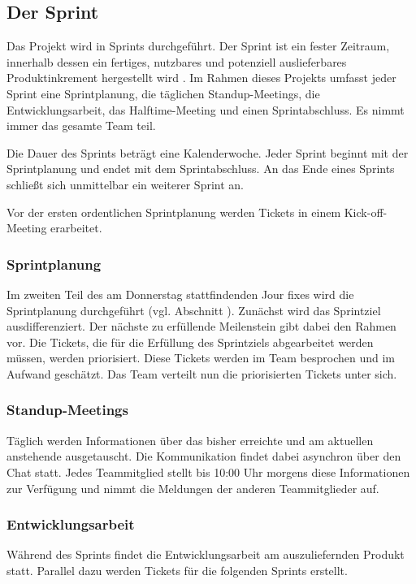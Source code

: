 \documentclass[a4paper,11pt,listof=numbered,glossary=totoc,parskip=half,toc=bib]{scrreprt}
\begin{document}
\subsection{Der Sprint}
Das Projekt wird in Sprints durchgeführt. Der Sprint ist ein fester Zeitraum, innerhalb dessen ein fertiges, nutzbares und potenziell auslieferbares Produktinkrement hergestellt wird \autocite[S.9]{Scrum}. Im Rahmen dieses Projekts umfasst jeder Sprint eine Sprintplanung, die täglichen Standup-Meetings, die Entwicklungsarbeit, das Halftime-Meeting und einen Sprintabschluss. Es nimmt immer das gesamte Team teil.

Die Dauer des Sprints beträgt eine Kalenderwoche. Jeder Sprint beginnt mit der Sprintplanung und endet mit dem Sprintabschluss. An das Ende eines Sprints schließt sich unmittelbar ein weiterer Sprint an.

Vor der ersten ordentlichen Sprintplanung werden Tickets in einem Kick-off-Meeting erarbeitet.

\subsubsection{Sprintplanung}
Im zweiten Teil des am Donnerstag stattfindenden Jour fixes wird die Sprintplanung durchgeführt (vgl. Abschnitt ). Zunächst wird das Sprintziel ausdifferenziert. Der nächste zu erfüllende Meilenstein gibt dabei den Rahmen vor. 
Die Tickets, die für die Erfüllung des Sprintziels abgearbeitet werden müssen, werden priorisiert. Diese Tickets werden im Team besprochen und im Aufwand geschätzt. Das Team verteilt nun die priorisierten Tickets unter sich.

\subsubsection{Standup-Meetings}
Täglich werden Informationen über das bisher erreichte und am aktuellen anstehende ausgetauscht. Die Kommunikation findet dabei asynchron über den Chat statt. Jedes Teammitglied stellt bis 10:00 Uhr morgens diese Informationen zur Verfügung und nimmt die Meldungen der anderen Teammitglieder auf.

\subsubsection{Entwicklungsarbeit}
Während des Sprints findet die Entwicklungsarbeit am auszuliefernden Produkt statt. Parallel dazu werden Tickets für die folgenden Sprints erstellt.
\end{document}
